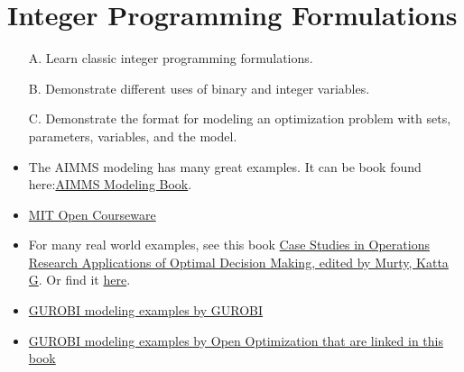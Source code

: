 


% 
%

\chapter{Integer Programming Formulations}
\label{sec:IP-formulations} 
\begin{outcome}
\begin{enumerate}
\item[A.] Learn classic integer programming formulations.
\item[B.] Demonstrate different uses of binary and integer variables.
\item[C.]  Demonstrate the format for modeling an optimization problem with sets, parameters, variables, and the model.
\end{enumerate}
\end{outcome}


\begin{resource}
\begin{itemize}
\item The AIMMS modeling has many great examples.  It can be book found here:\href{https://www.aimms.com/english/developers/resources/manuals/optimization-modeling}{AIMMS Modeling Book}.
\item \href{http://web.mit.edu/15.053/www/AMP-Chapter-09.pdf}{MIT Open Courseware}
\item  For many real world examples, see this book \href{https://link-springer-com.ezproxy.lib.vt.edu/book/10.1007/978-1-4939-1007-6}{
Case Studies in Operations Research
Applications of Optimal Decision Making, edited by  Murty, Katta G}.
Or find it \href{https://www.springer.com/gp/book/9781493910069}{here}.
\item \href{https://github.com/Gurobi/modeling-examples}{GUROBI modeling examples by GUROBI}
\item \href{https://github.com/open-optimization/open-optimization-or-examples/tree/master/integer-programming}{GUROBI modeling examples by Open Optimization that are linked in this book}
\end{itemize}

\end{resource}


